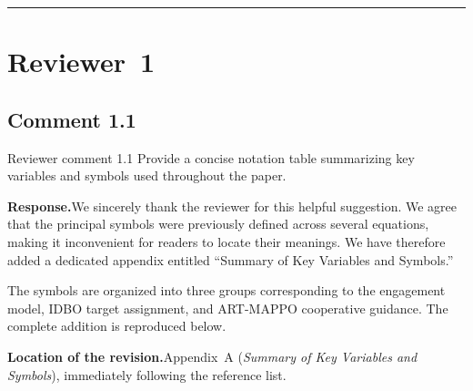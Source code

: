 \documentclass[11pt]{article}
\newcommand{\rsp}{\medskip\noindent\textbf{Response.}\quad}
\newcommand{\loc}{\medskip\noindent\textbf{Location of the revision.}\quad}
\begin{document}
\bigskip
\hrule
\bigskip

\section*{Reviewer~1}



\subsection*{Comment 1.1}

\begin{reviewercomment}{Reviewer comment 1.1}
Provide a concise notation table summarizing key variables and symbols used
throughout the paper.
\end{reviewercomment}

\rsp We sincerely thank the reviewer for this helpful suggestion. We agree
that the principal symbols were previously defined across several equations,
making it inconvenient for readers to locate their meanings. We have therefore
added a dedicated appendix entitled ``Summary of Key Variables and Symbols.''

The symbols are organized into three groups corresponding to
the engagement model, IDBO target assignment, and ART-MAPPO cooperative
guidance. The complete addition is reproduced below.

\loc Appendix~A (\emph{Summary of Key Variables and Symbols}), immediately
following the reference list.
\end{document}

